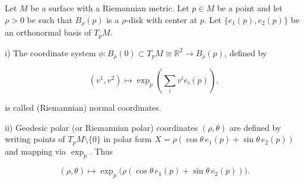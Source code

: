 Let $M$ be a surface with a Riemannian metric. Let $p \in M$ be a point and let $\rho > 0$ be such that $B_\rho(p)$ is a $\rho$-disk with center at $p$. Let $\{e_1(p), e_2(p)\}$ be an orthonormal basis of $T_p M$.

i) The coordinate system $\phi: B_\rho(0) \subset T_p M \cong \mathbb{R}^2 \rightarrow B_\rho(p)$, defined by

$$(v^1, v^2) \mapsto \exp_p\left(\sum_i v^i e_i(p)\right),$$

is called (Riemannian) normal coordinates.

ii) Geodesic polar (or Riemannian polar) coordinates $(\rho, \theta)$ are defined by writing points of $T_p M \setminus \{0\}$ in polar form $X = \rho (\cos\theta \, e_1(p) + \sin\theta \, e_2(p))$ and mapping via $\exp_p$. Thus

$$(\rho, \theta) \mapsto \exp_p\bigl(\rho(\cos\theta \, e_1(p) + \sin\theta \, e_2(p))\bigr).$$

